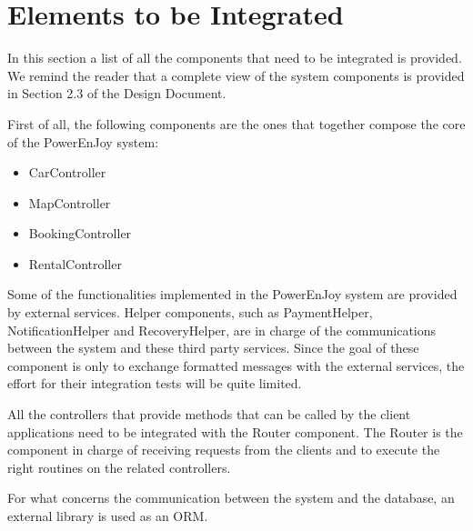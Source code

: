
\section{Elements to be Integrated}
In this section a list of all the components that need to be integrated is provided. We remind the reader that a complete view of the system components is provided in Section 2.3 of the Design Document.

First of all, the following components are the ones that together compose the core of the PowerEnJoy system:

\begin{itemize}
	\item CarController
	\item MapController
	\item BookingController
	\item RentalController
\end{itemize}

Some of the functionalities implemented in the PowerEnJoy system are provided by external services. Helper components, such as PaymentHelper, NotificationHelper and RecoveryHelper, are in charge of the communications between the system and these third party services. Since the goal of these component is only to exchange formatted messages with the external services, the effort for their integration tests will be quite limited.

All the controllers that provide methods that can be called by the client applications need to be integrated with the Router component. The Router is the component in charge of receiving requests from the clients and to execute the right routines on the related controllers.

For what concerns the communication between the system and the database, an external library is used as an ORM.
